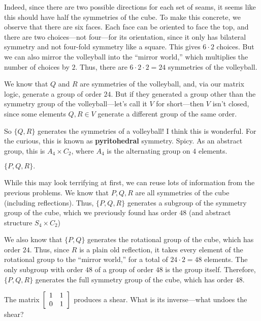\documentclass[../key.tex]{subfiles}
\begin{document}
Indeed, since there are two possible directions for each set of seams, it seems like this should have half the symmetries of the cube. To make this concrete, we observe that there are six faces. Each face can be oriented to face the top, and there are two choices---not four---for its orientation, since it only has bilateral symmetry and not four-fold symmetry like a square. This gives $6\cdot 2$ choices. But we can also mirror the volleyball into the ``mirror world,'' which multiplies the number of choices by $2$. Thus, there are $6\cdot 2\cdot 2=24$ symmetries of the volleyball.

We know that $Q$ and $R$ are symmetries of the volleyball, and, via our matrix logic, generate a group of order $24$. But if they generated a group other than the symmetry group of the volleyball---let's call it $V$ for short---then $V$ isn't closed, since some elements $Q,R\in V$ generate a different group of the same order.

So $\{Q,R\}$ generates the symmetries of a volleyball! I think this is wonderful. For the curious, this is known as \textbf{pyritohedral} symmetry. Spicy. As an abstract group, this is $A_4\times C_2$, where $A_4$ is the alternating group on $4$ elements.

\begin{inner_problem}
\item $\{P,Q,R\}.$
\end{inner_problem}

While this may look terrifying at first, we can reuse lots of information from the previous problems. We know that $P,Q,R$ are all symmetries of the cube (including reflections). Thus, $\{P,Q,R\}$ generates a subgroup of the symmetry group of the cube, which we previously found has order $48$ (and abstract structure $S_4\times C_2$)

We also know that $\{P,Q\}$ generates the rotational group of the cube, which has order $24$. Thus, since $R$ is a plain old reflection, it takes every element of the rotational group to the ``mirror world,'' for a total of $24\cdot 2 = 48$ elements. The only subgroup with order $48$ of a group of order $48$ is the group itself. Therefore, $\{P,Q,R\}$ generates the full symmetry group of the cube, which has order $48$.

\begin{outer_problem}
\item The matrix $\left[\begin{array}{cc} 1 & 1 \\ 0 & 1 \end{array}\right]$ produces a shear. What is its inverse---what undoes the shear?
\end{outer_problem}
\end{document}
